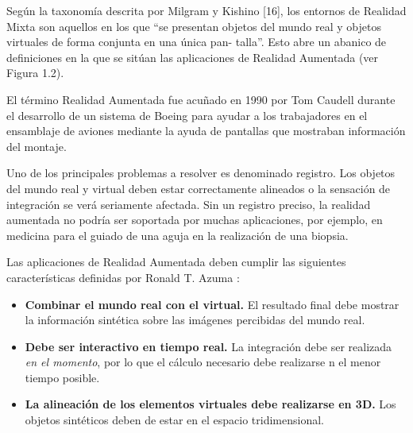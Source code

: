 Según la taxonomía descrita por Milgram y Kishino [16], los entornos
de Realidad Mixta son aquellos en los que “se presentan objetos del
mundo real y objetos virtuales de forma conjunta en una única pan-
talla”. Esto abre un abanico de definiciones en la que se sitúan las
aplicaciones de Realidad Aumentada (ver Figura 1.2).


El término Realidad Aumentada fue acuñado en 1990 por Tom Caudell durante el desarrollo de un sistema de Boeing para ayudar a los trabajadores en el ensamblaje de aviones mediante la ayuda de pantallas que mostraban información del montaje. 


Uno de los principales problemas a resolver es denominado registro. Los objetos del mundo real y virtual deben estar correctamente alineados o la sensación de integración se verá seriamente afectada. Sin un registro preciso, la realidad aumentada no podría ser soportada por muchas aplicaciones, por ejemplo, en medicina para el guiado de una aguja en la realización de una biopsia. 

Las aplicaciones de Realidad Aumentada deben cumplir las siguientes características definidas por Ronald T. Azuma \cite{Azuma}:
\begin{itemize}
\item \textbf{Combinar el mundo real con el virtual.} El resultado final debe mostrar la información sintética sobre las imágenes percibidas del mundo real.
\item \textbf{Debe ser interactivo en tiempo real.} La integración debe ser realizada \emph{en el momento}, por lo que el cálculo necesario debe realizarse n el menor tiempo posible.
\item \textbf{La alineación de los elementos virtuales debe realizarse en 3D.} Los objetos sintéticos deben de estar en el espacio tridimensional.
\end{itemize}


